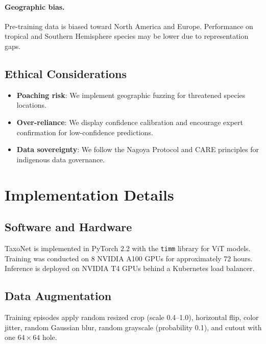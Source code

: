 \documentclass[11pt,a4paper]{article}
\begin{document}
\paragraph{Geographic bias.} Pre-training data is biased toward North
America and Europe. Performance on tropical and Southern Hemisphere
species may be lower due to representation gaps.

\subsection{Ethical Considerations}

\begin{itemize}
  \item \textbf{Poaching risk}: We implement geographic fuzzing for
    threatened species locations.
  \item \textbf{Over-reliance}: We display confidence calibration and
    encourage expert confirmation for low-confidence predictions.
  \item \textbf{Data sovereignty}: We follow the Nagoya Protocol and
    CARE principles for indigenous data governance.
\end{itemize}


\section{Implementation Details}
\label{sec:implementation}

\subsection{Software and Hardware}

TaxoNet is implemented in PyTorch 2.2 with the \texttt{timm} library for
ViT models. Training was conducted on 8 NVIDIA A100 GPUs for
approximately 72 hours. Inference is deployed on NVIDIA T4 GPUs behind a
Kubernetes load balancer.

\subsection{Data Augmentation}

Training episodes apply random resized crop (scale 0.4--1.0), horizontal
flip, color jitter, random Gaussian blur, random grayscale (probability
0.1), and cutout with one $64 \times 64$ hole.
\end{document}
